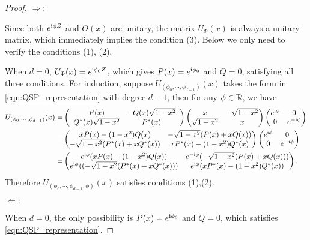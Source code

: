 \begin{proof}

$\Rightarrow:$

Since both $e^{\mathrm{i} \phi Z}$ and $O(x)$ are unitary, the matrix $U_{\Phi}(x)$ is always a unitary matrix, which immediately implies the condition (3).
Below we only need to verify the conditions (1), (2).

When $d=0$, $U_{\Phi}(x)=e^{\mathrm{i} \phi_0 Z}$, which gives $P(x)=e^{\mathrm{i} \phi_0}$ and $Q=0$, satisfying all three conditions. 
For induction, suppose $U_{(\phi_0,\cdots,\phi_{d-1})}(x)$ takes the form in \cref{eqn:QSP_representation} with degree $d-1$, then
for any $\phi\in\mathbb{R}$, we have
\begin{equation}
\begin{split}
U_{(\phi_0,\cdots,\phi_{d-1})}(x)=& \left( \begin{array}{cc}
        P(x) & -Q(x) \sqrt{1 - x^2}\\
        Q^*(x) \sqrt{1 - x^2} & P^*(x)
        \end{array} \right)\begin{pmatrix}
x & -\sqrt{1-x^2}\\
\sqrt{1-x^2} & x
\end{pmatrix}
\begin{pmatrix}
e^{\mathrm{i} \phi} & 0\\
0 & e^{-\mathrm{i} \phi}
\end{pmatrix}\\
=&\begin{pmatrix}
xP(x)-(1-x^2)Q(x) & -\sqrt{1-x^2}(P(x)+xQ(x))\\
-\sqrt{1-x^2}(P^*(x)+xQ^*(x)) & xP^*(x)-(1-x^2) Q^*(x)
\end{pmatrix}
\begin{pmatrix}
e^{\mathrm{i} \phi} & 0\\
0 & e^{-\mathrm{i} \phi}
\end{pmatrix}\\
=&\begin{pmatrix}
e^{\mathrm{i} \phi}(xP(x)-(1-x^2) Q(x)) & e^{-\mathrm{i} \phi}(-\sqrt{1-x^2}(P(x)+xQ(x)))\\
e^{\mathrm{i} \phi}((-\sqrt{1-x^2}(P^*(x)+xQ^*(x))) & e^{\mathrm{i} \phi}(xP^*(x)-(1-x^2) Q^*(x))
\end{pmatrix}.
\end{split}
\end{equation}
Therefore $U_{(\phi_0,\cdots,\phi_{d-1},\phi)}(x)$ satisfies conditions (1),(2).

$\Leftarrow:$

When $d=0$, the only possibility is $P(x)=e^{\mathrm{i} \phi_0}$ and $Q=0$, which satisfies \cref{eqn:QSP_representation}.


\end{proof}
